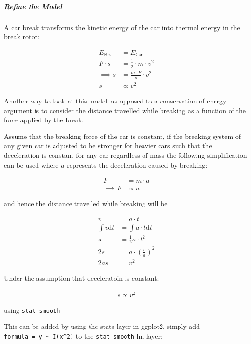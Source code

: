 \documentclass[]{article}
\let\oldsubparagraph\subparagraph
\renewcommand{\subparagraph}[1]{\oldsubparagraph{#1}\mbox{}}
\begin{document}
\hypertarget{refine-the-model}{%
\subparagraph{Refine the Model}\label{refine-the-model}}

A car break transforms the kinetic energy of the car into thermal energy
in the break rotor:

\[\begin{aligned}
E_\textsf{Brk} &= E_\textsf{Car} \\
F\cdot  s  &= \frac{1}{2}\cdot  m\cdot  v^2 \\
 \implies  s &=  \frac{m\cdot  F}{s} \cdot  v^2 \\
 s & \propto v^2
\end{aligned}\]

Another way to look at this model, as opposed to a conservation of
energy argument is to consider the distance travelled while breaking as
a function of the force applied by the break.

Assume that the breaking force of the car is constant, if the breaking
system of any given car is adjusted to be stronger for heavier cars such
that the deceleration is constant for any car regardless of mass the
following simplification can be used where \(a\) represents the
deceleration caused by breaking:

\[\begin{aligned}
F &=  m\cdot  a \\
\implies  F &\propto a
\end{aligned}\]

and hence the distance travelled while breaking will be

\[\begin{aligned}
v &=  a \cdot   t \\
\int v \mathrm{d}t &=  \int a\cdot t \mathrm{d}t  \\
s&= \frac{1}{2}a\cdot  t^2 \\
2s &= a\cdot  \left( \frac{v}{a} \right)^2\\
2as &= v^2
\end{aligned}\]

Under the assumption that deceleratoin is constant:

\[\begin{aligned}
s \propto v^2
\end{aligned}\]

using \texttt{stat\_smooth}

This can be added by using the stats layer in ggplot2, simply add
\texttt{formula\ =\ y\ \textasciitilde{}\ I(x\^{}2)} to the
\texttt{stat\_smooth} lm layer:
\end{document}

